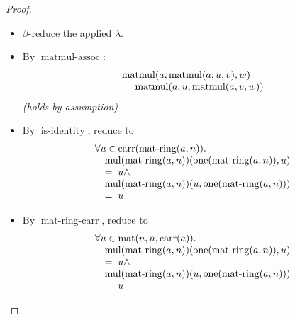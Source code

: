 \documentclass[11pt]{article}
\theoremstyle{plain}
\begin{document}
\begin{proof}
\begin{itemize}[leftmargin=2.8em, itemsep=4pt, parsep=1pt]
  \item[\textbf{91}] $\beta$-reduce the applied $\lambda$.
  \item[\textbf{92--94}] By $\operatorname{matmul\text{-}assoc}$:
\begin{equation*}
\begin{array}{@{}l@{}} \operatorname{matmul}(a, \operatorname{matmul}(a, u, v), w) \\ =\; \operatorname{matmul}(a, u, \operatorname{matmul}(a, v, w)) \end{array}
\end{equation*}
  \emph{(holds by assumption)}
  \item[\textbf{95}] By $\operatorname{is\text{-}identity}$, reduce to
\begin{equation*}
\begin{array}{@{}l@{}} \forall u \in \operatorname{carr}(\operatorname{mat\text{-}ring}(a, n)). \\ \quad \operatorname{mul}(\operatorname{mat\text{-}ring}(a, n))(\operatorname{one}(\operatorname{mat\text{-}ring}(a, n)), u) \\ \quad =\; u \wedge \\ \quad \operatorname{mul}(\operatorname{mat\text{-}ring}(a, n))(u, \operatorname{one}(\operatorname{mat\text{-}ring}(a, n))) \\ \quad =\; u \end{array}
\end{equation*}

  \item[\textbf{96}] By $\operatorname{mat\text{-}ring\text{-}carr}$, reduce to
\begin{equation*}
\begin{array}{@{}l@{}} \forall u \in \operatorname{mat}(n, n, \operatorname{carr}(a)). \\ \quad \operatorname{mul}(\operatorname{mat\text{-}ring}(a, n))(\operatorname{one}(\operatorname{mat\text{-}ring}(a, n)), u) \\ \quad =\; u \wedge \\ \quad \operatorname{mul}(\operatorname{mat\text{-}ring}(a, n))(u, \operatorname{one}(\operatorname{mat\text{-}ring}(a, n))) \\ \quad =\; u \end{array}
\end{equation*}


\end{itemize}
\end{proof}
\end{document}
